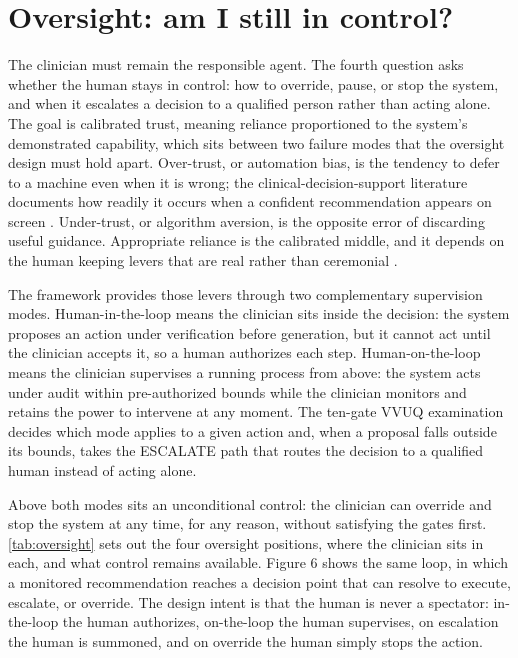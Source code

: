 \section{Oversight: am I still in control?}
\label{sec:oversight}

The clinician must remain the responsible agent. The fourth question asks whether
the human stays in control: how to override, pause, or stop the system, and when it
escalates a decision to a qualified person rather than acting alone. The goal is
calibrated trust, meaning reliance proportioned to the system's demonstrated
capability, which sits between two failure modes that the oversight design must
hold apart.
Over-trust, or automation bias, is the tendency to defer to a machine even when it
is wrong; the clinical-decision-support literature documents how readily it occurs
when a confident recommendation appears on screen \cite{goddard2012automation}.
Under-trust, or algorithm aversion, is the opposite error of discarding useful
guidance. Appropriate reliance is the calibrated middle, and it depends on the
human keeping levers that are real rather than ceremonial \cite{lee2004trust}.

The framework provides those levers through two complementary supervision modes.
Human-in-the-loop means the clinician sits inside the decision: the system proposes
an action under verification before generation, but it cannot act until the
clinician accepts it, so a human authorizes each step. Human-on-the-loop means the
clinician supervises a running process from above: the system acts under audit
within pre-authorized bounds while the clinician monitors and retains the power to
intervene at any moment. The ten-gate VVUQ examination decides which mode applies
to a given action and, when a proposal falls outside its bounds, takes the ESCALATE
path that routes the decision to a qualified human instead of acting alone.

Above both modes sits an unconditional control: the clinician can override and stop
the system at any time, for any reason, without satisfying the gates first.
\autoref{tab:oversight} sets out the four oversight positions, where the clinician
sits in each, and what control remains available. Figure 6 shows the same loop, in
which a monitored recommendation reaches a decision point that can resolve to
execute, escalate, or override. The design intent is that the human is never a
spectator: in-the-loop the human authorizes, on-the-loop the human supervises, on
escalation the human is summoned, and on override the human simply stops the action.

